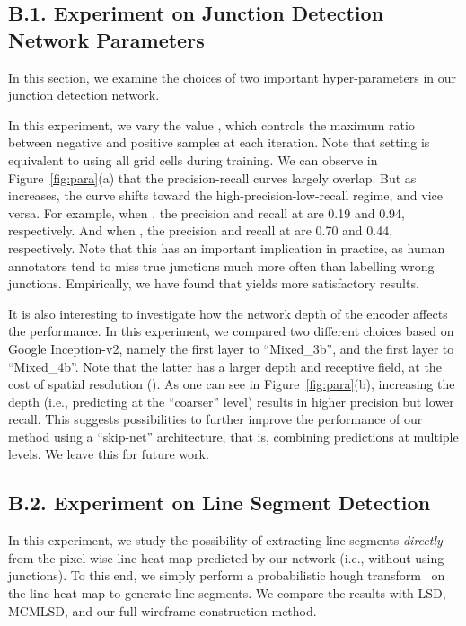 \documentclass[10pt,twocolumn,letterpaper]{article}
\begin{document}
\subsection*{B.1. Experiment on Junction Detection Network Parameters}

In this section, we examine the choices of two important hyper-parameters in our junction detection network.

\medskip
{} In this experiment, we vary the value , which controls the maximum ratio between negative and positive samples at each iteration. Note that setting  is equivalent to using all grid cells during training. We can observe in Figure~\ref{fig:para}(a) that the precision-recall curves largely overlap. But as  increases, the curve shifts toward the high-precision-low-recall regime, and vice versa. For example, when , the precision and recall at  are 0.19 and 0.94, respectively. And when , the precision and recall at  are 0.70 and 0.44, respectively. Note that this has an important implication in practice, as human annotators tend to miss true junctions much more often than labelling wrong junctions. Empirically, we have found that  yields more satisfactory results.

\medskip
{} It is also interesting to investigate how the network depth of the encoder affects the performance. In this experiment, we compared two different choices based on Google Inception-v2, namely the first layer to ``Mixed\_3b'', and the first layer to ``Mixed\_4b''. Note that the latter has a larger depth and receptive field, at the cost of spatial resolution (). As one can see in Figure~\ref{fig:para}(b), increasing the depth (i.e., predicting at the ``coarser'' level) results in higher precision but lower recall. This suggests possibilities to further improve the performance of our method using a ``skip-net'' architecture, that is, combining predictions at multiple levels. We leave this for future work.





\subsection*{B.2. Experiment on Line Segment Detection}

In this experiment, we study the possibility of extracting line segments \emph{directly} from the pixel-wise line heat map predicted by our network (i.e., without using junctions). To this end, we simply perform a probabilistic hough transform~\cite{matas2000robust} on the line heat map to generate line segments. We compare the results with LSD, MCMLSD, and our full wireframe construction method. 
\end{document}

